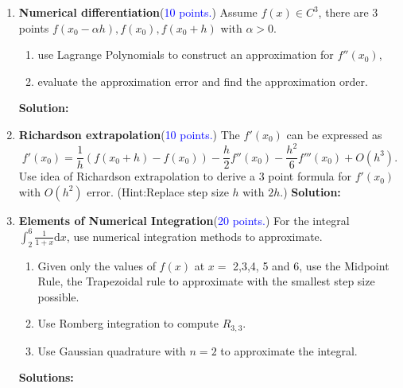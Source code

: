 \documentclass[11pt]{article}
\begin{document}
\newpage
\begin{enumerate}
  \item \textbf{Numerical differentiation}(\textcolor{blue}{10 points.}) 
  Assume $f(x)\in C^3$, there are 3 points $f(x_0-\alpha h),f(x_0),f(x_0+ h)$ with $\alpha>0$. 
  \begin{enumerate}
      \item use Lagrange Polynomials to construct an approximation for $f''(x_0)$,
      \item evaluate the approximation error and find the approximation order.
  \end{enumerate}   
\textbf{Solution:}
    
\item \textbf{Richardson extrapolation}(\textcolor{blue}{10 points.}) The $f'(x_0)$ can be expressed as 
\begin{equation}
\label{eq:3order_forward_diff}
    f'(x_0) = \frac{1}{h}(f(x_0+h) - f(x_0)) - \frac{h}{2}f''(x_0) -\frac{h^2}{6}f'''(x_0) + O(h^3).
\end{equation} 
Use idea of Richardson extrapolation to derive a 3 point formula for $f'(x_0)$ with $O(h^2)$ error. 
(Hint:Replace step size $h$ with $2h$.)
\newline \textbf{Solution:}

\item \textbf{Elements of Numerical Integration}(\textcolor{blue}{20 points.})
For the integral $\int_2^6 \frac{1}{1+x}\mathrm{d}x$, use numerical integration methods to approximate.
\begin{enumerate}
    \item Given only the values of $f(x)$ at $x=$ 2,3,4, 5 and 6, use the Midpoint Rule, the Trapezoidal rule to approximate with the smallest step size possible.
    \item Use Romberg integration to compute $R_{3,3}$.
    \item Use Gaussian quadrature with $n=2$ to approximate the integral.
\end{enumerate}
\textbf{Solutions:}


\end{enumerate}
\end{document}
